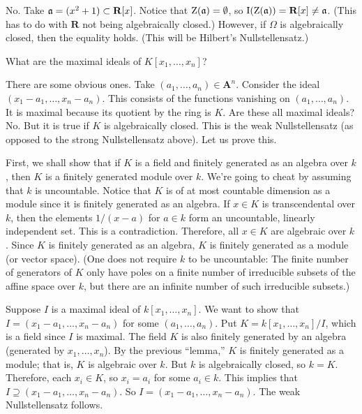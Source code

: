 \documentclass [11 pt, oneside, margin = 1 in] {article}
\begin{document}
No. Take $\mathfrak{a} = (x^2 + 1) \subset \mathbf R[x]$. Notice that $\operatorname{Z}(\mathfrak{a})= \emptyset$, so $\operatorname{I}(\operatorname{Z}(\mathfrak{a})) = \mathbf{R}[x]\ne \mathfrak{a}$. (This has to do with $\mathbf{R}$ not being algebraically closed.) However, if $\Omega$ is algebraically closed, then the equality holds. (This will be Hilbert's Nullstellensatz.) 

\begin{problem}
	What are the maximal ideals of $K[x_1,\hdots, x_n]$?
\end{problem}

There are some obvious ones. Take $(a_1,\hdots, a_n)\in \mathbf{A}^n$. Consider the ideal $(x_1-a_1,\hdots, x_n-a_n)$. This consists of the functions vanishing on $(a_1,\hdots, a_n)$. It is maximal because its quotient by the ring is $K$. Are these all maximal ideals? No. But it is true if $K$ is algebraically closed. This is the weak Nullstellensatz  (as opposed to the strong Nullstellensatz above). Let us prove this.

First, we shall show that if $K$ is a field and finitely generated as an algebra over $k$, then $K$ is a finitely generated module over $k$. We're going to cheat by assuming that $k$ is uncountable. Notice that $K$ is of at most countable dimension as a module since it is finitely generated as an algebra. If $x\in K$ is transcendental over $k$, then the elements $1/(x-a)$ for $a\in k$ form an uncountable, linearly independent set. This is a contradiction. Therefore, all $x\in K$ are algebraic over $k$. Since $K$ is finitely generated as an algebra, $K$ is finitely generated as a module (or vector space). (One does not require $k$ to be uncountable: The finite number of generators of $K$ only have poles on a finite number of irreducible subsets of the affine space over $k$, but there are an infinite number of such irreducible subsets.)

Suppose $I$ is a maximal ideal of $k[x_1,\hdots, x_n]$. We want to show that $I = (x_1-a_1,\hdots, x_n-a_n)$ for some $(a_1,\hdots, a_n)$. Put $K = k[x_1,\hdots, x_n]/I$, which is a field since $I$ is maximal. The field $K$ is also finitely generated by an algebra (generated by $x_1,\hdots, x_n$). By  the previous ``lemma,'' $K$ is finitely generated as a module; that is, $K$ is algebraic over $k$. But $k$ is algebraically closed, so $k=K$. Therefore, each $x_i\in K$, so $x_i=a_i$ for some $a_i\in k$. This implies that $I\supseteq (x_1-a_1,\hdots, x_n-a_n)$. So $I = (x_1-a_1,\hdots, x_n-a_n)$. The weak Nullstellensatz follows.
\end{document}
